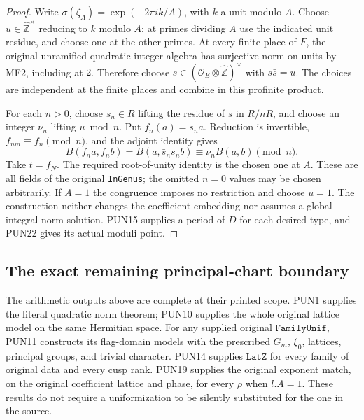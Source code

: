 \begin{proof}
Write \(\sigma(\zeta_A)=\exp(-2\pi i k/A)\), with
\(k\) a unit modulo \(A\).  Choose
\(u\in\widehat{\mathbb Z}^{\times}\) reducing to \(k\)
modulo \(A\): at primes dividing \(A\) use the indicated
unit residue, and choose one at the other primes.
At every finite place of \(F\), the original unramified
quadratic integer algebra has surjective norm on units by
MF2, including at \(2\).  Therefore choose
\(s\in(\mathcal O_E\otimes\widehat{\mathbb Z})^\times\)
with \(s\bar s=u\).  The choices are independent at the
finite places and combine in this profinite product.

For each \(n>0\), choose \(s_n\in R\) lifting the residue
of \(s\) in \(R/nR\), and choose an integer \(\nu_n\)
lifting \(u\bmod n\).  Put \(f_n(a)=s_na\).
Reduction is invertible, \(f_{nm}\equiv f_n\pmod n\), and
the adjoint identity gives
\[
 B(f_na,f_nb)=B(a,\bar s_ns_nb)
                              \equiv\nu_nB(a,b)\pmod n.
\]
Take \(t=f_N\).  The required root-of-unity identity is the
chosen one at \(A\).  These are all fields of the original
\texttt{InGenus}; the omitted \(n=0\) values may be chosen
arbitrarily.  If \(A=1\) the congruence imposes no restriction
and choose \(u=1\).  The construction neither changes the
coefficient embedding nor assumes a global integral norm
solution.  PUN15 supplies a period of \(D\) for each desired
type, and PUN22 gives its actual moduli point.
\end{proof}

\subsection{The exact remaining principal-chart boundary}

The arithmetic outputs above are complete at their printed
scope.  PUN1 supplies the literal quadratic norm theorem;
PUN10 supplies the whole original lattice model on the same
Hermitian space.  For any supplied original
\(\texttt{FamilyUnif}\), PUN11 constructs its flag-domain
models with the prescribed \(G_m\), \(\xi_0\), lattices,
principal groups, and trivial character.  PUN14 supplies
\(\texttt{LatZ}\) for every family of original data and every
cusp rank.  PUN19 supplies the original exponent match,
on the original coefficient lattice and phase, for every
\(\rho\) when \(l.A=1\).  These results do not require a
uniformization to be silently substituted for the one in the
source.

